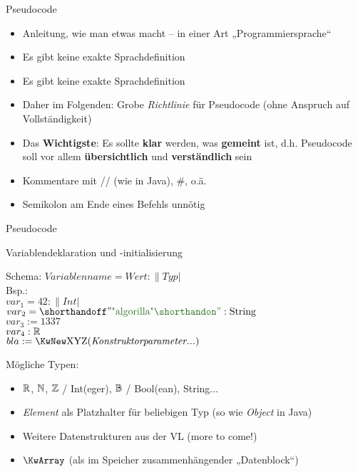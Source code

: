 
\begin{frame}{Pseudocode}
	\begin{itemize}
		\item Anleitung, wie man etwas macht -- in einer Art „Programmiersprache“
		\pause
		\item[\Pros] Es gibt keine exakte Sprachdefinition
		\item[\Cons] Es gibt keine exakte Sprachdefinition
		\pause
		\item Daher im Folgenden: Grobe \textit{Richtlinie} für Pseudocode (ohne Anspruch auf Vollständigkeit)
		\item Das \textbf{Wichtigste}: Es sollte \textbf{klar} werden, was \textbf{gemeint} ist, d.h. Pseudocode soll vor allem \textbf{übersichtlich} und \textbf{verständlich} sein
		\pause
		\item Kommentare mit // (wie in Java), \#, o.ä.
		\item Semikolon am Ende eines Befehls unnötig
	\end{itemize}
\end{frame}

\begin{frame}{Pseudocode} 
	\begin{exampleblock}{Variablendeklaration und -initialisierung}
		\begin{algorithm}[H]
			Schema: \quad $ Variablenname = Wert : \|Typ| $ \\
			\pause
			Bsp.: \\
			 \quad $ var_1 = 42 : \|Int| $ \\
			 \quad $ var_2 = \str{algorilla} : \|String| $ \\
			 \quad $ var_3 := 1337  $ \qquad {} \\
			 \quad $ var_4 : \mathbb{R} $ \qquad {} \\
			 \quad $ bla := \KwNew \|XYZ|(\textit{Konstruktorparameter...}) $ \\
		\end{algorithm}
	\end{exampleblock}
	\pause
	Mögliche Typen: \\
	\begin{itemize}
		\item $\mathbb{R}$, $\mathbb{N}$, $\mathbb{Z}$ / Int(eger), $\mathbb{B}$ / Bool(ean), String...
		\item \textit{Element} als Platzhalter für beliebigen Typ (so wie \textit{Object} in Java) 
		\item Weitere Datenstrukturen aus der VL (more to come!)
		\item $\KwArray$ (als im Speicher zusammenhängender „Datenblock“)
	\end{itemize}
\end{frame}



